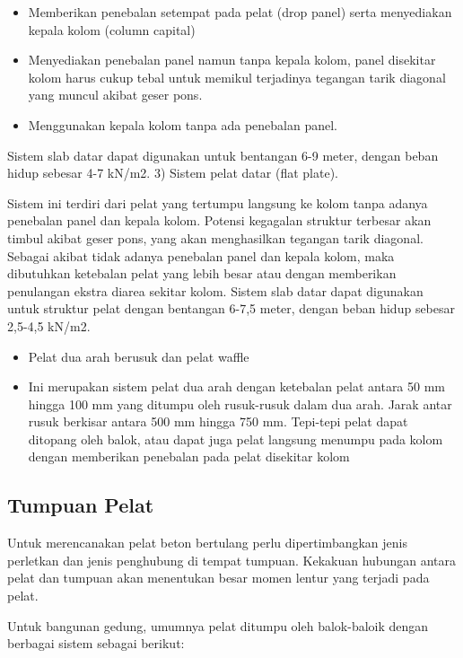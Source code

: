 \documentclass[../modul_skb.tex]{subfiles}
\begin{document}
\begin{itemize}
	\item Memberikan penebalan setempat pada pelat (drop panel) serta menyediakan kepala kolom (column capital)
	\item Menyediakan penebalan panel namun tanpa kepala kolom, panel disekitar kolom harus cukup tebal untuk memikul terjadinya tegangan tarik diagonal yang muncul akibat geser pons.
	\item Menggunakan kepala kolom tanpa ada penebalan panel.
\end{itemize}

Sistem slab datar dapat digunakan untuk bentangan 6-9 meter, dengan beban hidup sebesar 4-7 kN/m2. 3) Sistem pelat datar (flat plate).

Sistem ini terdiri dari pelat yang tertumpu langsung ke kolom tanpa adanya penebalan panel dan kepala kolom. Potensi kegagalan struktur terbesar akan timbul akibat geser pons, yang akan menghasilkan tegangan tarik diagonal. Sebagai akibat tidak adanya penebalan panel dan kepala kolom, maka dibutuhkan ketebalan pelat yang lebih besar atau dengan memberikan penulangan ekstra diarea sekitar kolom. Sistem slab datar dapat digunakan untuk struktur pelat dengan bentangan 6-7,5 meter, dengan beban hidup sebesar 2,5-4,5 kN/m2.

\begin{itemize}
	\item Pelat dua arah berusuk dan pelat waffle
	\item[] Ini merupakan sistem pelat dua arah dengan ketebalan pelat antara 50 mm hingga 100 mm yang ditumpu oleh rusuk-rusuk dalam dua arah. Jarak antar rusuk berkisar antara 500 mm hingga 750 mm. Tepi-tepi pelat dapat ditopang oleh balok, atau dapat juga pelat langsung menumpu pada kolom dengan memberikan penebalan pada pelat disekitar kolom \end{itemize}

\subsection{Tumpuan Pelat}%
\label{sub:Tumpuan Pelat}
Untuk merencanakan pelat beton bertulang perlu dipertimbangkan jenis perletkan dan jenis penghubung di tempat tumpuan. Kekakuan hubungan antara pelat dan tumpuan akan menentukan besar momen lentur yang terjadi pada pelat.

Untuk bangunan gedung, umumnya pelat ditumpu oleh balok-baloik dengan berbagai sistem sebagai berikut:
\end{document}
